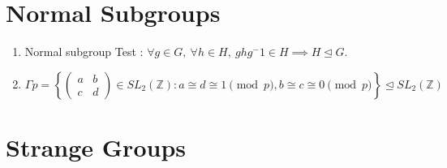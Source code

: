 \section{Normal Subgroups}
\begin{enumerate}
	\item Normal subgroup Test : $\forall g \in G,\ \forall h \in H,\ ghg^-1 \in H \implies H \trianglelefteq G$.
	\item $$\Gamma p = \left\{ \begin{pmatrix} a & b \\ c & d \end{pmatrix} \in SL_2(\mathbb{Z}) : a \cong d \cong 1 \pmod{p}, b \cong c \cong 0 \pmod{p} \right\} \trianglelefteq SL_2(\mathbb{Z})$$
\end{enumerate}

\section{Strange Groups}
